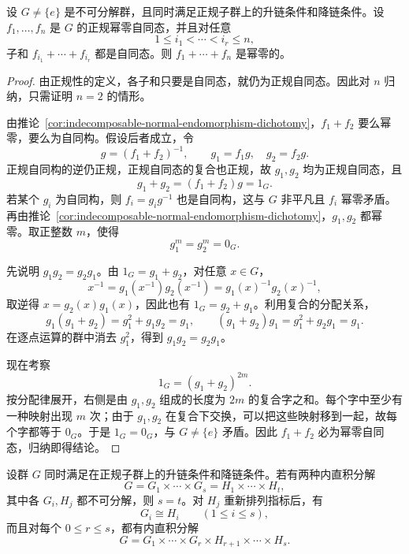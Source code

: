 \begin{corollary}\label{cor:sum-nilpotent-normal-endomorphisms}
设 $G\ne\{e\}$ 是不可分解群，且同时满足正规子群上的升链条件和降链条件。设 $f_1,\ldots,f_n$ 是 $G$ 的正规幂零自同态，并且对任意
\[
  1\leq i_1<\cdots<i_r\leq n,
\]
子和 $f_{i_1}+\cdots+f_{i_r}$ 都是自同态。则 $f_1+\cdots+f_n$ 是幂零的。
\end{corollary}

\begin{proof}
由正规性的定义，各子和只要是自同态，就仍为正规自同态。因此对 $n$ 归纳，只需证明 $n=2$ 的情形。

由推论~\ref{cor:indecomposable-normal-endomorphism-dichotomy}，$f_1+f_2$ 要么幂零，要么为自同构。假设后者成立，令
\[
  g=(f_1+f_2)^{-1},\qquad
  g_1=f_1g,\quad g_2=f_2g.
\]
正规自同构的逆仍正规，正规自同态的复合也正规，故 $g_1,g_2$ 均为正规自同态，且
\[
  g_1+g_2=(f_1+f_2)g=1_G.
\]
若某个 $g_i$ 为自同构，则 $f_i=g_ig^{-1}$ 也是自同构，这与 $G$ 非平凡且 $f_i$ 幂零矛盾。再由推论~\ref{cor:indecomposable-normal-endomorphism-dichotomy}，$g_1,g_2$ 都幂零。取正整数 $m$，使得
\[
  g_1^m=g_2^m=0_G.
\]

先说明 $g_1g_2=g_2g_1$。由 $1_G=g_1+g_2$，对任意 $x\in G$，
\[
  x^{-1}=g_1(x^{-1})g_2(x^{-1})
         =g_1(x)^{-1}g_2(x)^{-1},
\]
取逆得 $x=g_2(x)g_1(x)$，因此也有 $1_G=g_2+g_1$。利用复合的分配关系，
\[
  g_1(g_1+g_2)=g_1^2+g_1g_2=g_1,
  \qquad
  (g_1+g_2)g_1=g_1^2+g_2g_1=g_1.
\]
在逐点运算的群中消去 $g_1^2$，得到 $g_1g_2=g_2g_1$。

现在考察
\[
  1_G=(g_1+g_2)^{2m}.
\]
按分配律展开，右侧是由 $g_1,g_2$ 组成的长度为 $2m$ 的复合字之和。每个字中至少有一种映射出现 $m$ 次；由于 $g_1,g_2$ 在复合下交换，可以把这些映射移到一起，故每个字都等于 $0_G$。于是 $1_G=0_G$，与 $G\ne\{e\}$ 矛盾。因此 $f_1+f_2$ 必为幂零自同态，归纳即得结论。
\end{proof}

\begin{theorem}\label{thm:krull-schmidt}
设群 $G$ 同时满足在正规子群上的升链条件和降链条件。若有两种内直积分解
\[
  G=G_1\times\cdots\times G_s
   =H_1\times\cdots\times H_t,
\]
其中各 $G_i,H_j$ 都不可分解，则 $s=t$。对 $H_j$ 重新排列指标后，有
\[
  G_i\cong H_i\qquad(1\leq i\leq s),
\]
而且对每个 $0\leq r\leq s$，都有内直积分解
\[
  G=G_1\times\cdots\times G_r
       \times H_{r+1}\times\cdots\times H_s.
\]
\end{theorem}

